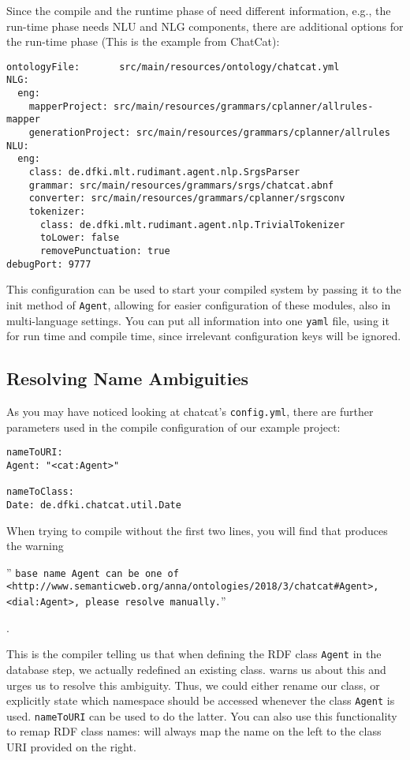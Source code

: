 Since the compile and the runtime phase of \vonda need different information,
e.g., the run-time phase needs NLU and NLG components, there are additional
options for the run-time phase (This is the example from ChatCat):

\begin{verbatim}
ontologyFile:       src/main/resources/ontology/chatcat.yml
NLG:
  eng:
    mapperProject: src/main/resources/grammars/cplanner/allrules-mapper
    generationProject: src/main/resources/grammars/cplanner/allrules
NLU:
  eng:
    class: de.dfki.mlt.rudimant.agent.nlp.SrgsParser
    grammar: src/main/resources/grammars/srgs/chatcat.abnf
    converter: src/main/resources/grammars/cplanner/srgsconv
    tokenizer:
      class: de.dfki.mlt.rudimant.agent.nlp.TrivialTokenizer
      toLower: false
      removePunctuation: true
debugPort: 9777
\end{verbatim}

This configuration can be used to start your compiled system by passing it to
the init method of \texttt{Agent}, allowing for easier configuration of these
modules, also in multi-language settings. You can put all information into one
\texttt{yaml} file, using it for run time and compile time, since irrelevant
configuration keys will be ignored.

\subsection{Resolving Name Ambiguities} \label{sec:nsAmbigue}

As you may have noticed looking at chatcat's \texttt{config.yml}, there are
further parameters used in the compile configuration of our example project:

\begin{verbatim}
nameToURI:
Agent: "<cat:Agent>"

nameToClass:
Date: de.dfki.chatcat.util.Date
\end{verbatim}

When trying to compile without the first two lines, you will find that \vonda
produces the warning \begin{small}'' \texttt{base name Agent can be one of
    <http://www.semanticweb.org/anna/ontologies/2018/3/chatcat\#Agent>,
    <dial:Agent>, please resolve manually.}''
\end{small}.

This is the compiler telling us that when defining the RDF class \texttt{Agent}
in the database step, we actually redefined an existing class. \vonda warns us
about this and urges us to resolve this ambiguity. Thus, we could either rename
our class, or explicitly state which namespace should be accessed whenever the
class \texttt{Agent} is used. \texttt{nameToURI} can be used to do the latter.
You can also use this functionality to remap RDF class names: \vonda will
always map the name on the left to the class URI provided on the right.

